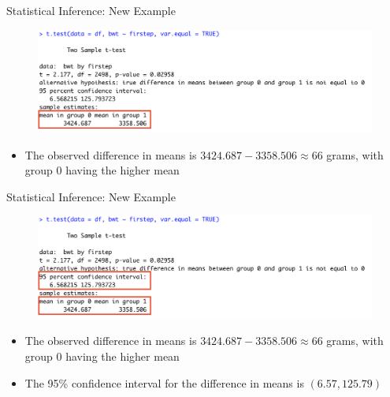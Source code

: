 \documentclass[10pt,t]{beamer}
\begin{document}
\begin{frame}{Statistical Inference: New Example}
\begin{figure}
	\centering \includegraphics[scale=0.5]{ttest2.png}
\end{figure}

\begin{itemize}
	\item The observed difference in means is $3424.687-  3358.506 \approx 66$ grams, with group $0$ having the higher mean
\end{itemize}


\end{frame}

\begin{frame}{Statistical Inference: New Example}
\begin{figure}
	\centering \includegraphics[scale=0.5]{ttest3.png}
\end{figure}

\begin{itemize}
	\item The observed difference in means is $3424.687-  3358.506 \approx 66$ grams, with group $0$ having the higher mean
	\item The 95\% confidence interval for the difference in means is $(6.57, 125.79)$
\end{itemize}

\end{frame}
\end{document}
